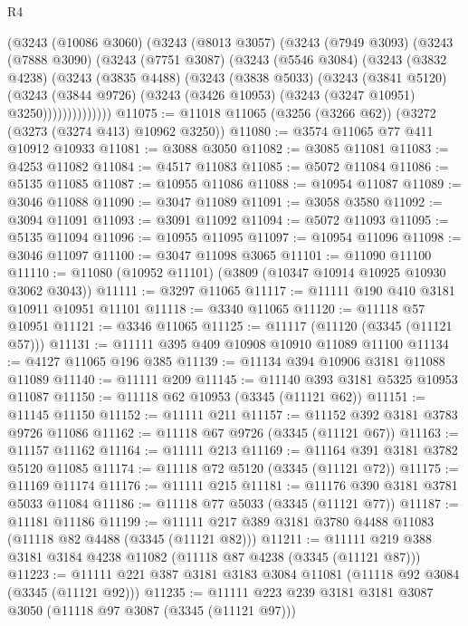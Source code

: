 \begin{lexlean}{R4}
\begin{coremodule}
      (@3243
        (@10086 @3060)
        (@3243
          (@8013 @3057)
          (@3243
            (@7949 @3093)
            (@3243
              (@7888 @3090)
              (@3243
                (@7751 @3087)
                (@3243
                  (@5546 @3084)
                  (@3243
                    (@3832 @4238)
                    (@3243
                      (@3835 @4488)
                      (@3243
                        (@3838 @5033)
                        (@3243
                          (@3841 @5120)
                          (@3243
                            (@3844 @9726)
                            (@3243 (@3426 @10953) (@3243 (@3247 @10951) @3250))))))))))))))
@11075 := @11018 @11065 (@3256 (@3266 @62)) (@3272 (@3273 (@3274 @413) @10962 @3250))
@11080 := @3574 @11065 @77 @411 @10912 @10933
@11081 := @3088 @3050
@11082 := @3085 @11081
@11083 := @4253 @11082
@11084 := @4517 @11083
@11085 := @5072 @11084
@11086 := @5135 @11085
@11087 := @10955 @11086
@11088 := @10954 @11087
@11089 := @3046 @11088
@11090 := @3047 @11089
@11091 := @3058 @3580
@11092 := @3094 @11091
@11093 := @3091 @11092
@11094 := @5072 @11093
@11095 := @5135 @11094
@11096 := @10955 @11095
@11097 := @10954 @11096
@11098 := @3046 @11097
@11100 := @3047 @11098 @3065
@11101 := @11090 @11100
@11110 := @11080 (@10952 @11101) (@3809 (@10347 @10914 @10925 @10930 @3062 @3043))
@11111 := @3297 @11065
@11117 := @11111 @190 @410 @3181 @10911 @10951 @11101
@11118 := @3340 @11065
@11120 := @11118 @57 @10951
@11121 := @3346 @11065
@11125 := @11117 (@11120 (@3345 (@11121 @57)))
@11131 := @11111 @395 @409 @10908 @10910 @11089 @11100
@11134 := @4127 @11065 @196 @385
@11139 := @11134 @394 @10906 @3181 @11088 @11089
@11140 := @11111 @209
@11145 := @11140 @393 @3181 @5325 @10953 @11087
@11150 := @11118 @62 @10953 (@3345 (@11121 @62))
@11151 := @11145 @11150
@11152 := @11111 @211
@11157 := @11152 @392 @3181 @3783 @9726 @11086
@11162 := @11118 @67 @9726 (@3345 (@11121 @67))
@11163 := @11157 @11162
@11164 := @11111 @213
@11169 := @11164 @391 @3181 @3782 @5120 @11085
@11174 := @11118 @72 @5120 (@3345 (@11121 @72))
@11175 := @11169 @11174
@11176 := @11111 @215
@11181 := @11176 @390 @3181 @3781 @5033 @11084
@11186 := @11118 @77 @5033 (@3345 (@11121 @77))
@11187 := @11181 @11186
@11199 := @11111 @217 @389 @3181 @3780 @4488 @11083 (@11118 @82 @4488 (@3345 (@11121 @82)))
@11211 := @11111 @219 @388 @3181 @3184 @4238 @11082 (@11118 @87 @4238 (@3345 (@11121 @87)))
@11223 := @11111 @221 @387 @3181 @3183 @3084 @11081 (@11118 @92 @3084 (@3345 (@11121 @92)))
@11235 := @11111 @223 @239 @3181 @3181 @3087 @3050 (@11118 @97 @3087 (@3345 (@11121 @97)))

\end{coremodule}
\end{lexlean}

